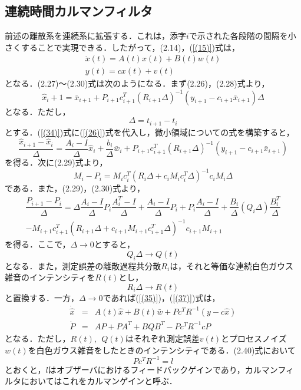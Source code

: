 \documentclass[a4paper,12pt]{jarticle}
\begin{document}
\subsection{連続時間カルマンフィルタ}
%
前述の離散系を連続系に拡張する．これは，添字$ i $で示された各段階の間隔を小さくすることで実現できる．したがって，(2.14)，(\ref{(15)})式は，
%
\begin{eqnarray}
 \dot{x}(t) = A(t)x(t) + B(t)w(t) \\
 y(t) = cx(t) + v(t)
\end{eqnarray}
%
となる．(2.27)〜(2.30)式は次のようになる．まず(2.26)，(2.28)式より，
%
\begin{equation}
 \hat{x}_i+1 = \bar{x}_{i+1} + P_{i+1}c_{i+1}^T (R_{i+1}\Delta)^{-1}(y_{i+1} - c_{i+1}\bar{x}_{i+1})\Delta
\label{(34)}
\end{equation}
%
となる．ただし，
%
\begin{equation}
 \Delta = t_{i+1} - t_i
\end{equation}
とする．(\ref{(34)})式に(\ref{(26)})式を代入し，微小領域についての式を構築すると，
%
\begin{equation}
 \dfrac{\hat{x}_{i+1} - \hat{x}_i}{\Delta} = \dfrac{A_i - I}{\Delta}\hat{x}_i + \dfrac{b_i}{\Delta}\bar{w}_i + P_{i+1}c_{i+1}^T(R_{i+1} \Delta)^{-1}(y_{i+1} - c_{i+1}\bar{x}_{i+1})
\label{(35)}
\end{equation}
%
を得る．次に(2.29)式より，
%
\begin{equation}
 M_i -P_i = M_ic_i^T (R_i \Delta + c_iM_ic_i^T \Delta)^{-1}c_iM_i\Delta
\end{equation}
%
である．また，(2.29)，(2.30)式より，
%
\begin{eqnarray}
 \dfrac{P_{i+1} - P_i}{\Delta} = \Delta\dfrac{A_i - I}{\Delta}P_i\dfrac{A_i^T - I}{\Delta} + \dfrac{A_i - I}{\Delta}P_i + P_i\dfrac{A_i - I}{\Delta} + \dfrac{B_i}{\Delta}(Q_i\Delta)\dfrac{B_i^T}{\Delta} \nonumber \\
 - M_{i+1}c_{i+1}^T(R_{i+1} \Delta + c_{i+1}M_{i+1}c_{i+1}^T \Delta)^{-1}c_{i+1}M_{i+1}
\label{(37)}
\end{eqnarray}
%
を得る．ここで，$ \Delta → 0 $とすると，
%
\begin{equation}
 Q_i \Delta → Q(t)
\end{equation}
%
となる．また，測定誤差の離散過程共分散$ R_i $は，それと等価な連続白色ガウス雑音のインテンシティを$ R(t) $とし，
%
\begin{equation}
 R_i \Delta → R(t)
\end{equation}
%
と置換する．一方，$ \Delta → 0 $であれば(\ref{(35)})，(\ref{(37)})式は，
%
\begin{eqnarray}
 \dot{\hat{x}} & = & A(t) \hat{x} + B(t) \bar{w} + Pc^TR^{-1}(y-c\hat{x})\\
 \dot{P} & = & AP + PA^T + BQB^T - Pc^TR^{-1}cP
\end{eqnarray}
%
となる．ただし，$ R(t) , ~~ Q(t) $はそれぞれ測定誤差$ v(t) $とプロセスノイズ$ w(t) $を白色ガウス雑音をしたときのインテンシティである．(2.40)式において
%
\begin{equation}
 Pc^TR^{-1} = l
\end{equation}
%
とおくと，$ l $はオブザーバにおけるフィードバックゲインであり，カルマンフィルタにおいてはこれをカルマンゲインと呼ぶ．
\end{document}
